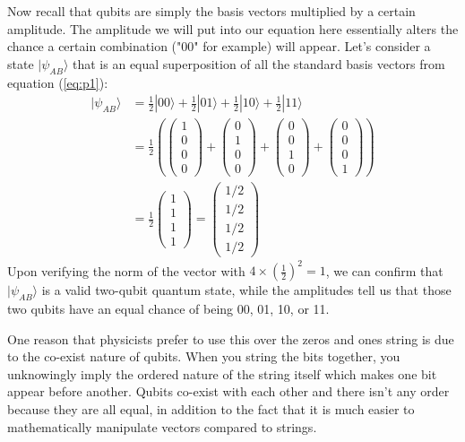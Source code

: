 Now recall that qubits are simply the basis vectors multiplied by a certain amplitude. The amplitude we will put into our equation here essentially alters the chance a certain combination ("00" for example) will appear. Let's consider a state $|\psi_{AB}\rangle$ that is an equal superposition of all the standard basis vectors from equation (\ref{eq:p1}):
\[\begin{aligned}
    |\psi_{AB}\rangle 
    &= \frac{1}{2}|00\rangle + \frac{1}{2}|01\rangle + \frac{1}{2}|10\rangle + \frac{1}{2}|11\rangle \\
    &= \frac{1}{2}(
        \begin{pmatrix}1 \\ 0 \\ 0 \\ 0\end{pmatrix} +
        \begin{pmatrix}0 \\ 1 \\ 0 \\ 0\end{pmatrix} +
        \begin{pmatrix}0 \\ 0 \\ 1 \\ 0\end{pmatrix} +
        \begin{pmatrix}0 \\ 0 \\ 0 \\ 1\end{pmatrix}
    ) \\
    &= \frac{1}{2}\begin{pmatrix}1 \\ 1 \\ 1 \\ 1\end{pmatrix}
    = \begin{pmatrix}
        1/2 \\ 1/2 \\ 1/2 \\ 1/2
    \end{pmatrix}
\end{aligned}\]
Upon verifying the norm of the vector with $4\times(\frac{1}{2})^2 = 1$, we can confirm that $|\psi_{AB}\rangle$ is a valid two-qubit quantum state, while the amplitudes tell us that those two qubits have an equal chance of being 00, 01, 10, or 11.

One reason that physicists prefer to use this over the zeros and ones string is due to the co-exist nature of qubits. When you string the bits together, you unknowingly imply the ordered nature of the string itself which makes one bit appear before another. Qubits co-exist with each other and there isn't any order because they are all equal, in addition to the fact that it is much easier to mathematically manipulate vectors compared to strings.

